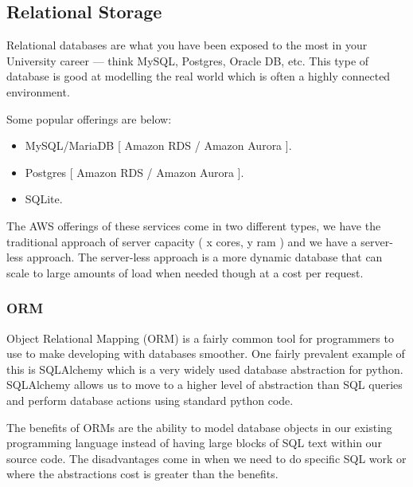 \documentclass{csse4400}
\begin{document}

\subsection{Relational Storage}

Relational databases are what you have been exposed to the most in your University career --- think MySQL, Postgres, Oracle DB, etc.
This type of database is good at modelling the real world which is often a highly connected environment.

Some popular offerings are below:

\begin{itemize}
  \item MySQL/MariaDB [ Amazon RDS / Amazon Aurora ].
  \item Postgres [ Amazon RDS / Amazon Aurora ].
  \item SQLite.
\end{itemize}

The AWS offerings of these services come in two different types, we have the traditional approach of
server capacity ( x cores, y ram ) and we have a server-less approach.
The server-less approach is a more dynamic
database that can scale to large amounts of load when needed though at a cost per request.

  \subsubsection{ORM}
  Object Relational Mapping (ORM) is a fairly common tool for programmers to use to make developing with databases smoother.
  One fairly prevalent example of this is SQLAlchemy which is a very widely used 
  database abstraction for python.
  SQLAlchemy allows us to move to a higher level of abstraction than SQL queries and perform database actions using standard python code.

  The benefits of ORMs are the ability to model database objects in our existing programming language instead of having large blocks of SQL text within our source code.
  The disadvantages come in when we need to do specific SQL work or where the abstractions cost is greater than the benefits.
\end{document}
